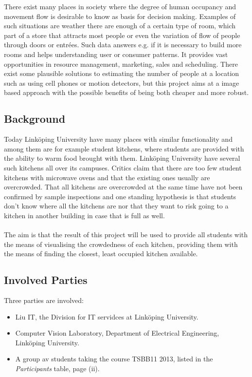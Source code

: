 There exist many places in society where the degree of human occupancy and movement flow is desirable to know as basis for decision making. Examples of such situations are weather there are enough of a certain type of room, which part of a store that attracts most people or even the variation of flow of people through doors or entrées. Such data answers e.g. if it is necessary to build more rooms and helps understanding user or consumer patterns. It provides vast opportunities in resource management, marketing, sales and scheduling. There exist some plausible solutions to estimating the number of people at a location such as using cell phones or motion detectors, but this project aims at a image based approach with the possible benefits of being both cheaper and more robust.

\subsection{Background}
Today Linköping University have many places with similar functionality and among them are for example student kitchens, where students are provided with the ability to warm food brought with them. Linköping University have several such kitchens all over its campuses. Critics claim that there are too few student kitchens with microwave ovens and that the existing ones usually are overcrowded. That all kitchens are overcrowded at the same time have not been confirmed by sample inspections and one standing hypothesis is that students don't know where all the kitchens are nor that they want to risk going to a kitchen in another building in case that is full as well.\\
\\
The aim is that the result of this project will be used to provide all students with the means of visualising the crowdedness of each kitchen, providing them with the means of finding the closest, least occupied kitchen available.

\subsection{Involved Parties}
Three parties are involved:
\begin{itemize}
\item Liu IT, the Division for IT servidces at Linköping University.
\item Computer Vision Laboratory, Department of Electrical Engineering, Linköping University.
\item A group av students taking the course TSBB11 2013, listed in the \textit{Participants} table, page (ii).
\end{itemize}

